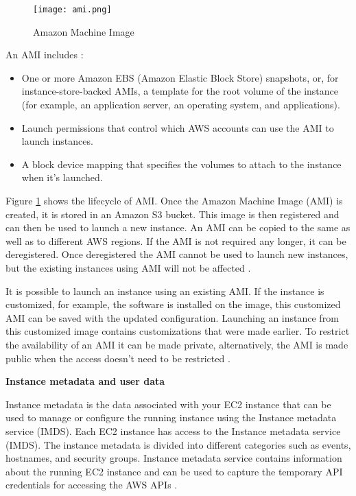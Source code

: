 \begin{figure}
    \centering
    \texttt{[image: ami.png]}
    \caption{Amazon Machine Image}
    \label{fig:ami}
\end{figure}

\par An AMI includes \cite{30}:
\begin{itemize}
    \item One or more Amazon EBS (Amazon Elastic Block Store) snapshots, or, for instance-store-backed AMIs, a template for the root volume of the instance (for example, an application server, an operating system, and applications).
\end{itemize}
\begin{itemize}
    \item Launch permissions that control which AWS accounts can use the AMI to launch instances.
\end{itemize}
\begin{itemize}
    \item A block device mapping that specifies the volumes to attach to the instance when it's launched.
\end{itemize}



\par Figure \ref{fig:ami} shows the lifecycle of AMI. Once the Amazon Machine Image (AMI) is created, it is stored in
an Amazon S3 bucket. This image is then registered and can then be used to launch a new instance. An AMI can be
copied to the same as well as to different AWS regions. If the AMI is not required any longer, it can be deregistered. Once deregistered the AMI cannot be used to launch new instances, but the existing instances using AMI will not be affected \cite{30}.

\par It is possible to launch an instance using an existing AMI. If the instance is customized, for example, the
software is installed on the image, this customized AMI can be saved with the updated configuration. Launching an
instance from this customized image contains customizations that were made earlier. To restrict the availability of
an AMI it can be made private, alternatively, the AMI is made public when the access doesn’t need to be restricted \cite{31}.




\textbf{Instance metadata and user data}
\par Instance metadata is the data associated with your EC2 instance that can be used to manage or configure the
running instance using the Instance metadata service (IMDS). Each EC2 instance has access to the Instance metadata
service (IMDS). The instance metadata is divided into different categories such as events, hostnames, and security
groups. Instance metadata service contains information about the running EC2 instance and can be used to capture the temporary API credentials for accessing the AWS APIs \cite{32}.

